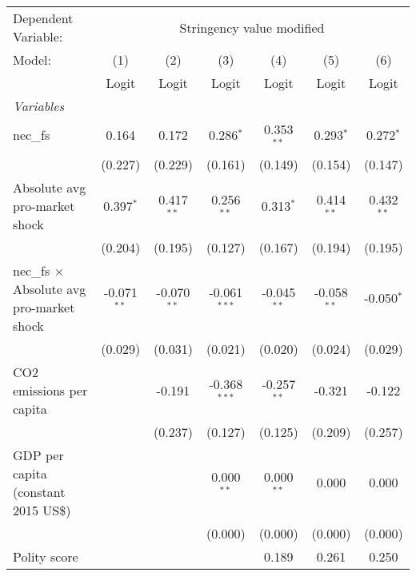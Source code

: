 
\begingroup
\centering
\begin{tabular}{lcccccc}
   \toprule
   Dependent Variable: & \multicolumn{6}{c}{Stringency value modified}\\
   Model:                                           & (1)           & (2)           & (3)            & (4)           & (5)           & (6)\\  
                                                    &  Logit        & Logit         & Logit          & Logit         & Logit         & Logit\\  
   \midrule
   \emph{Variables}\\
   nec\_fs                                          & 0.164         & 0.172         & 0.286$^{*}$    & 0.353$^{**}$  & 0.293$^{*}$   & 0.272$^{*}$\\   
                                                    & (0.227)       & (0.229)       & (0.161)        & (0.149)       & (0.154)       & (0.147)\\   
   Absolute avg pro-market shock                    & 0.397$^{*}$   & 0.417$^{**}$  & 0.256$^{**}$   & 0.313$^{*}$   & 0.414$^{**}$  & 0.432$^{**}$\\   
                                                    & (0.204)       & (0.195)       & (0.127)        & (0.167)       & (0.194)       & (0.195)\\   
   nec\_fs $\times$ Absolute avg pro-market shock   & -0.071$^{**}$ & -0.070$^{**}$ & -0.061$^{***}$ & -0.045$^{**}$ & -0.058$^{**}$ & -0.050$^{*}$\\   
                                                    & (0.029)       & (0.031)       & (0.021)        & (0.020)       & (0.024)       & (0.029)\\   
   CO2 emissions per capita                         &               & -0.191        & -0.368$^{***}$ & -0.257$^{**}$ & -0.321        & -0.122\\   
                                                    &               & (0.237)       & (0.127)        & (0.125)       & (0.209)       & (0.257)\\   
   GDP per capita (constant 2015 US\$)              &               &               & 0.000$^{**}$   & 0.000$^{**}$  & 0.000         & 0.000\\   
                                                    &               &               & (0.000)        & (0.000)       & (0.000)       & (0.000)\\   
   Polity score                                     &               &               &                & 0.189         & 0.261         & 0.250\\   

\end{tabular}
